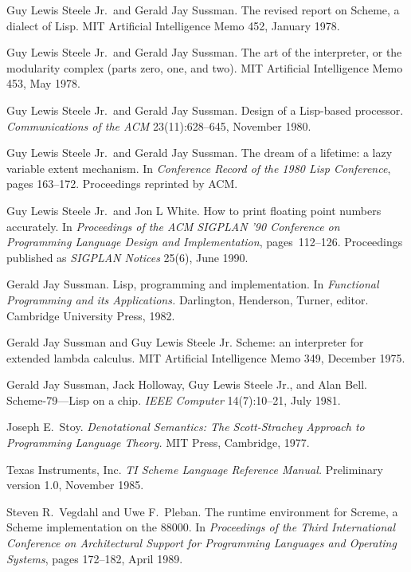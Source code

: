 \begin{thebibliography}{999}
Guy Lewis Steele Jr.~and Gerald Jay Sussman.
The revised report on Scheme, a dialect of Lisp.
MIT Artificial Intelligence Memo 452, January 1978.

Guy Lewis Steele Jr.~and Gerald Jay Sussman.
The art of the interpreter, or the modularity complex (parts zero, one,
  and two).
MIT Artificial Intelligence Memo 453, May 1978.

Guy Lewis Steele Jr.~and Gerald Jay Sussman.
Design of a Lisp-based processor.
{\em Communications of the ACM} 23(11):628--645, November 1980.

Guy Lewis Steele Jr.~and Gerald Jay Sussman.
The dream of a lifetime: a lazy variable extent mechanism.
In {\em Conference Record of the 1980 Lisp Conference}, pages 163--172.
Proceedings reprinted by ACM.

Guy Lewis Steele Jr.~and Jon L White.
How to print floating point numbers accurately.
In {\em Proceedings of the ACM SIGPLAN '90 Conference
  on Programming Language Design and Implementation}, pages~112--126.
Proceedings published as {\em SIGPLAN Notices} 25(6), June 1990.

Gerald Jay Sussman.
Lisp, programming and implementation.
In {\em Functional Programming and its Applications.}
Darlington, Henderson, Turner, editor.
Cambridge University Press, 1982.

Gerald Jay Sussman and Guy Lewis Steele Jr.
Scheme: an interpreter for extended lambda calculus.
MIT Artificial Intelligence Memo 349, December 1975.

Gerald Jay Sussman, Jack Holloway, Guy Lewis Steele Jr., and Alan Bell.
Scheme-79---Lisp on a chip.
{\em IEEE Computer} 14(7):10--21, July 1981.

Joseph E.~Stoy.
{\em Denotational Semantics: The Scott-Strachey Approach to
  Programming Language Theory.}
MIT Press, Cambridge, 1977.

Texas Instruments, Inc.
{\em TI Scheme Language Reference Manual.}
Preliminary version 1.0, November 1985.

Steven R.~Vegdahl and Uwe F.~Pleban.
The runtime environment for Screme, a Scheme implementation on the 88000.
In {\em Proceedings of the Third International Conference on Architectural
  Support for Programming Languages and Operating Systems},
  pages 172--182, April 1989.


\end{thebibliography}

